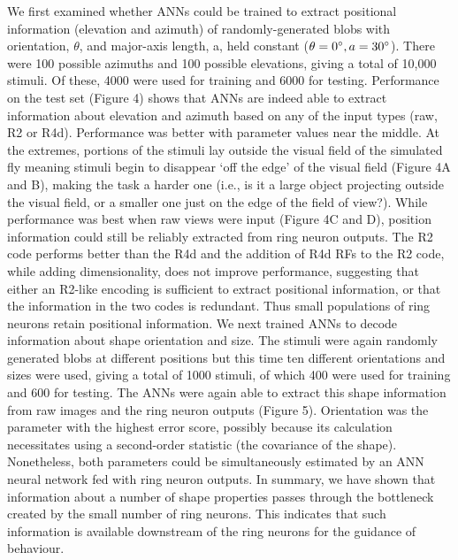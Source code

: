 \documentclass[10pt]{article}
\begin{document}
We first examined whether ANNs could be trained to extract positional information (elevation and azimuth) of randomly-generated blobs with orientation, $\theta$, and major-axis length, a, held constant ($\theta=0\degree, a = 30\degree$). There were 100 possible azimuths and 100 possible elevations, giving a total of 10,000 stimuli. Of these, 4000 were used for training and 6000 for testing. Performance on the test set (Figure 4) shows that ANNs are indeed able to extract information about elevation and azimuth based on any of the input types (raw, R2 or R4d). Performance was better with parameter values near the middle. At the extremes, portions of the stimuli lay outside the visual field of the simulated fly meaning stimuli begin to disappear ‘off the edge’ of the visual field (Figure 4A and B), making the task a harder one (i.e., is it a large object projecting outside the visual field, or a smaller one just on the edge of the field of view?). While performance was best when raw views were input (Figure 4C and D), position information could still be reliably extracted from ring neuron outputs. The R2 code performs better than the R4d and the addition of R4d RFs to the R2 code, while adding dimensionality, does not improve performance, suggesting that either an R2-like encoding is sufficient to extract positional information, or that the information in the two codes is redundant. Thus small populations of ring neurons retain positional information. 
We next trained ANNs to decode information about shape orientation and size. The stimuli were again randomly generated blobs at different positions but this time ten different orientations and sizes were used, giving a total of 1000 stimuli, of which 400 were used for training and 600 for testing. The ANNs were again able to extract this shape information from raw images and the ring neuron outputs (Figure 5). Orientation was the parameter with the highest error score, possibly because its calculation necessitates using a second-order statistic (the covariance of the shape). Nonetheless, both parameters could be simultaneously estimated by an ANN neural network fed with ring neuron outputs. 
In summary, we have shown that information about a number of shape properties passes through the bottleneck created by the small number of ring neurons. This indicates that such information is available downstream of the ring neurons for the guidance of behaviour.
\end{document}
